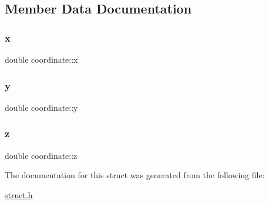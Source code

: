 \subsection{Member Data Documentation}
\mbox{\label{structcoordinate_a3a164e660f2488a90d90f349d3b02010}} 
\subsubsection{\texorpdfstring{x}{x}}
{\footnotesize\ttfamily double coordinate\+::x}

\mbox{\label{structcoordinate_a11b4100f0f7449334bd3957db9be03cc}} 
\subsubsection{\texorpdfstring{y}{y}}
{\footnotesize\ttfamily double coordinate\+::y}

\mbox{\label{structcoordinate_a3f539772abb900009e378d254cb7b3c1}} 
\subsubsection{\texorpdfstring{z}{z}}
{\footnotesize\ttfamily double coordinate\+::z}



The documentation for this struct was generated from the following file\+:\begin{DoxyCompactItemize}
\item 
\hyperlink{struct_8h}{struct.\+h}\end{DoxyCompactItemize}
